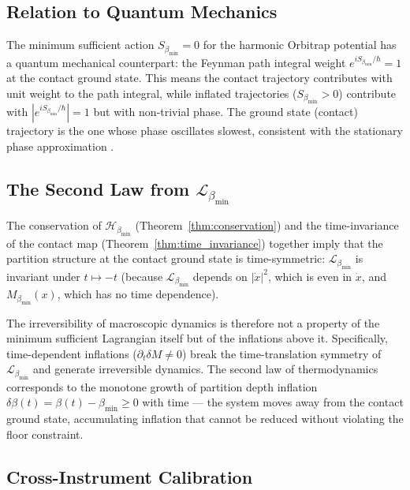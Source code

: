 \documentclass[12pt, a4paper]{article}
\theoremstyle{plain}
\theoremstyle{definition}
\theoremstyle{remark}
\newcommand{\bmin}{\beta_{\min}}
\newcommand{\Lmin}{\mathcal{L}_{\bmin}}
\newcommand{\Smin}{S_{\bmin}}
\newcommand{\Hmin}{\mathcal{H}_{\bmin}}
\begin{document}
\subsection{Relation to Quantum Mechanics}

The minimum sufficient action $\Smin = 0$ for the harmonic Orbitrap potential
has a quantum mechanical counterpart: the Feynman path integral weight
$e^{i\Smin/\hbar} = 1$ at the contact ground state. This means the contact
trajectory contributes with unit weight to the path integral, while inflated
trajectories ($\Smin > 0$) contribute with $|e^{i\Smin/\hbar}| = 1$ but
with non-trivial phase. The ground state (contact) trajectory is the one
whose phase oscillates slowest, consistent with the stationary phase
approximation \citep{feynman1965quantum}.

\subsection{The Second Law from $\Lmin$}

The conservation of $\Hmin$ (Theorem~\ref{thm:conservation}) and the
time-invariance of the contact map (Theorem~\ref{thm:time_invariance}) together
imply that the partition structure at the contact ground state is
time-symmetric: $\Lmin$ is invariant under $t \mapsto -t$ (because $\Lmin$
depends on $|\dot{x}|^2$, which is even in $\dot{x}$, and $M_{\bmin}(x)$,
which has no time dependence).

The irreversibility of macroscopic dynamics is therefore not a property of the
minimum sufficient Lagrangian itself but of the inflations above it. Specifically,
time-dependent inflations ($\partial_t\delta M \neq 0$) break the
time-translation symmetry of $\Lmin$ and generate irreversible dynamics. The
second law of thermodynamics corresponds to the monotone growth of partition
depth inflation $\delta\beta(t) = \beta(t) - \bmin \geq 0$ with time ---
the system moves away from the contact ground state, accumulating inflation
that cannot be reduced without violating the floor constraint.

\subsection{Cross-Instrument Calibration}
\end{document}
